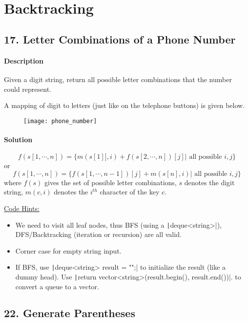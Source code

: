 \section{Backtracking}

\subsection{17. Letter Combinations of a Phone Number}

\paragraph{\color{white} \colorbox{Mahogany}{Description}}
Given a digit string, return all possible letter combinations that the number could represent.

A mapping of digit to letters (just like on the telephone buttons) is given below.

\begin{figure}[ht]
    \centering
    \texttt{[image: phone\_number]}
    \label{fig:phone_number}
\end{figure}

\paragraph{\color{white} \colorbox{OliveGreen}{Solution}}
$$f(s[1,\cdots,n])=\{m(s[1]],i)+f(s[2,\cdots,n])[j]|\text{ all possible } i,j\}$$
or
$$f(s[1,\cdots,n])=\{f(s[1,\cdots,n-1])[j]+m(s[n],i)|\text{ all possible } i,j\}$$
where $f(s)$ gives the set of possible letter combinations, $s$ denotes the digit string, $m(c,i)$ denotes the $i^{th}$ character of the key $c$.


\underline{Code Hints:}
\begin{itemize}
    \item We need to visit all leaf nodes, thus BFS (using a \texttt|deque<string>|), DFS/Backtracking (iteration or recursion) are all valid.
    \item Corner case for empty string input.
    \item If BFS, use \texttt|deque<string> result = {""};| to initialize the result (like a dummy head). Use \texttt|return vector<string>(result.begin(), result.end())|. to convert a queue to a vector.
\end{itemize}

\subsection{22. Generate Parentheses}

